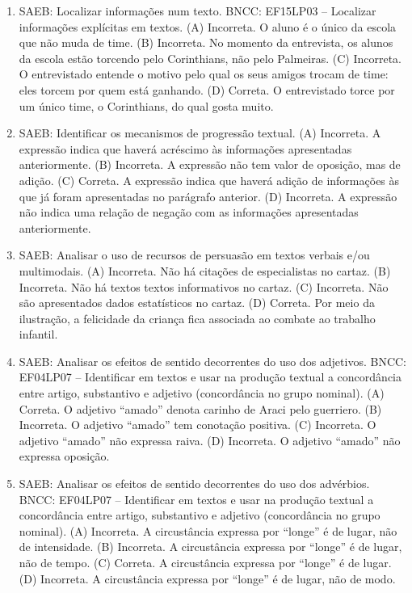 \begin{enumerate}
\item
SAEB: Localizar informações num texto. BNCC: EF15LP03 -- Localizar informações explícitas em textos. 
(A) Incorreta. O aluno é o único da escola que não muda de time. 
(B) Incorreta. No momento da entrevista, os alunos da escola estão torcendo pelo Corinthians, não pelo Palmeiras. 
(C) Incorreta. O entrevistado entende o motivo pelo qual os seus amigos trocam de time: eles torcem por quem está ganhando. 
(D) Correta. O entrevistado torce por um único time, o Corinthians, do qual gosta muito.

\item
SAEB: Identificar os mecanismos de progressão textual. 
(A) Incorreta. A expressão indica que haverá acréscimo às informações apresentadas anteriormente. 
(B) Incorreta. A expressão não tem valor de oposição, mas de adição. 
(C) Correta. A expressão indica que haverá adição de informações às que já foram apresentadas no parágrafo anterior. 
(D) Incorreta. A expressão não indica uma relação de negação com as informações apresentadas anteriormente.

\item
SAEB: Analisar o uso de recursos de persuasão em textos verbais e/ou multimodais.
(A) Incorreta. Não há citações de especialistas no cartaz. 
(B) Incorreta. Não há textos textos informativos no cartaz. 
(C) Incorreta. Não são apresentados dados estatísticos no cartaz. 
(D) Correta. Por meio da ilustração, a felicidade da criança fica associada ao combate ao trabalho infantil.

\item
SAEB: Analisar os efeitos de sentido decorrentes do uso dos adjetivos. BNCC: EF04LP07 -- Identificar em textos e usar na produção textual a concordância entre artigo, substantivo e adjetivo (concordância no grupo nominal). 
(A) Correta. O adjetivo ``amado'' denota carinho de Araci pelo guerriero. 
(B) Incorreta. O adjetivo ``amado'' tem conotação positiva. 
(C) Incorreta. O adjetivo ``amado'' não expressa raiva. 
(D) Incorreta. O adjetivo ``amado'' não expressa oposição.

\item
SAEB: Analisar os efeitos de sentido decorrentes do uso dos advérbios. BNCC: EF04LP07 -- Identificar em textos e usar na produção textual a concordância entre artigo, substantivo e adjetivo (concordância no grupo nominal). 
(A) Incorreta. A circustância expressa por ``longe'' é de lugar, não de intensidade. 
(B) Incorreta. A circustância expressa por ``longe'' é de lugar, não de tempo. 
(C) Correta.  A circustância expressa por ``longe'' é de lugar. 
(D) Incorreta. A circustância expressa por ``longe'' é de lugar, não de modo.


\end{enumerate}
